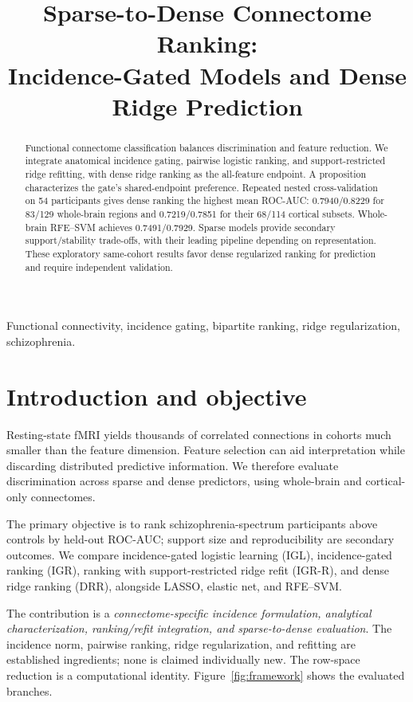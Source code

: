 \documentclass{article}
\title{Sparse-to-Dense Connectome Ranking:\\Incidence-Gated Models and Dense Ridge Prediction}
\begin{document}
\ninept
\maketitle

\begin{abstract}
Functional connectome classification balances discrimination and feature reduction. We integrate anatomical incidence gating, pairwise logistic ranking, and support-restricted ridge refitting, with dense ridge ranking as the all-feature endpoint. A proposition characterizes the gate's shared-endpoint preference. Repeated nested cross-validation on 54 participants gives dense ranking the highest mean ROC-AUC: 0.7940/0.8229 for 83/129 whole-brain regions and 0.7219/0.7851 for their 68/114 cortical subsets. Whole-brain RFE--SVM achieves 0.7491/0.7929. Sparse models provide secondary support/stability trade-offs, with their leading pipeline depending on representation. These exploratory same-cohort results favor dense regularized ranking for prediction and require independent validation.

\end{abstract}
\begin{keywords}
Functional connectivity, incidence gating, bipartite ranking, ridge regularization, schizophrenia.
\end{keywords}

\section{Introduction and objective}
Resting-state fMRI yields thousands of correlated connections in cohorts much smaller than the feature dimension. Feature selection can aid interpretation while discarding distributed predictive information. We therefore evaluate discrimination across sparse and dense predictors, using whole-brain and cortical-only connectomes.

The primary objective is to rank schizophrenia-spectrum participants above controls by held-out ROC-AUC; support size and reproducibility are secondary outcomes. We compare incidence-gated logistic learning (IGL), incidence-gated ranking (IGR), ranking with support-restricted ridge refit (IGR-R), and dense ridge ranking (DRR), alongside LASSO, elastic net, and RFE--SVM.

The contribution is a \emph{connectome-specific incidence formulation, analytical characterization, ranking/refit integration, and sparse-to-dense evaluation}. The incidence norm, pairwise ranking, ridge regularization, and refitting are established ingredients; none is claimed individually new. The row-space reduction is a computational identity. Figure~\ref{fig:framework} shows the evaluated branches.
\end{document}
